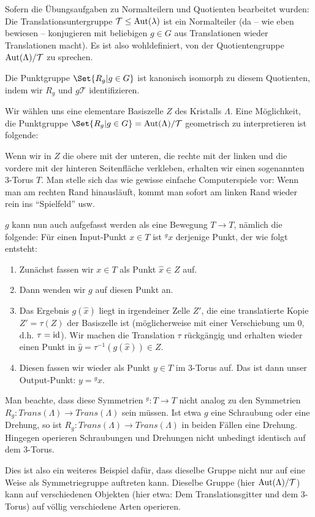 \begin{remark}
Sofern die Übungsaufgaben zu Normalteilern und Quotienten bearbeitet wurden: Die Translationsuntergruppe $\mathcal{T}\leq\operatorname{Aut}(\lambda)$ ist ein Normalteiler (da -- wie eben bewiesen -- konjugieren mit beliebigen $g\in G$ aus Translationen wieder Translationen macht). Es ist also wohldefiniert, von der Quotientengruppe $\operatorname{Aut}(\Lambda) / \mathcal{T}$ zu sprechen.

Die Punktgruppe $\Set{R_g | g\in G}$ ist kanonisch isomorph zu diesem Quotienten, indem wir $R_g$ und $g\mathcal{T}$ identifizieren.
\end{remark}

\begin{remark}
Wir wählen uns eine elementare Basiszelle $Z$ des Kristalls $\Lambda$. Eine Möglichkeit, die Punktgruppe $\Set{R_g | g\in G}=\Aut(\Lambda)/\mathcal{T}$ geometrisch zu interpretieren ist folgende:

Wenn wir in $Z$ die obere mit der unteren, die rechte mit der linken und die vordere mit der hinteren Seitenfläche verkleben, erhalten wir einen sogenannten 3-Torus $T$. Man stelle sich das wie gewisse einfache Computerspiele vor: Wenn man am rechten Rand hinausläuft, kommt man sofort am linken Rand wieder rein ins \enquote{Spielfeld} usw.

\medbreak
$g$ kann nun auch aufgefasst werden als eine Bewegung $T\to T$, nämlich die folgende: Für einen Input-Punkt $x\in T$ ist ${^g x}$ derjenige Punkt, der wie folgt entsteht:
\begin{enumerate}
\item Zunächst fassen wir $x\in T$ als Punkt $\hat{x}\in Z$ auf.
\item Dann wenden wir $g$ auf diesen Punkt an.
\item Das Ergebnis $g(\hat{x})$ liegt in irgendeiner Zelle $Z'$, die eine translatierte Kopie $Z'=\tau(Z)$ der Basiszelle ist (möglicherweise mit einer Verschiebung um $0$, d.h. $\tau=\operatorname{id}$). Wir machen die Translation $\tau$ rückgängig und erhalten wieder einen Punkt in $\hat{y}=\tau^{-1}(g(\hat{x}))\in Z$.
\item Diesen fassen wir wieder als Punkt $y\in T$ im 3-Torus auf. Das ist dann unser Output-Punkt: $y={^g x}$.
\end{enumerate}

Man beachte, dass diese Symmetrien ${^g}: T\to T$ nicht analog zu den Symmetrien $R_g: Trans(\Lambda)\to Trans(\Lambda)$ sein müssen. Ist etwa $g$ eine Schraubung oder eine Drehung, so ist $R_g: Trans(\Lambda) \to Trans(\Lambda)$ in beiden Fällen eine Drehung. Hingegen operieren Schraubungen und Drehungen nicht unbedingt identisch auf dem 3-Torus.

Dies ist also ein weiteres Beispiel dafür, dass dieselbe Gruppe nicht nur auf eine Weise als Symmetriegruppe auftreten kann. Dieselbe Gruppe (hier $\operatorname{Aut}(\Lambda) /\mathcal{T}$) kann auf verschiedenen Objekten (hier etwa: Dem Translationsgitter und dem 3-Torus) auf völlig verschiedene Arten operieren.
\end{remark}


